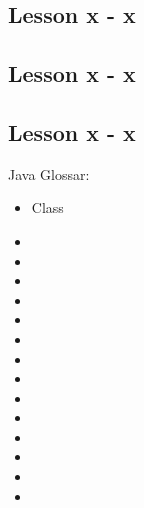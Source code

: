 \subsection{Lesson x - x}

\subsection{Lesson x - x}

\subsection{Lesson x - x}



Java Glossar:

\begin{itemize}
    \item Class
    \item 
    \item 
    \item 
    \item 
    \item 
    \item 
    \item 
    \item 
    \item 
    \item 
    \item 
    \item 
    \item 
    \item 
    
\end{itemize}